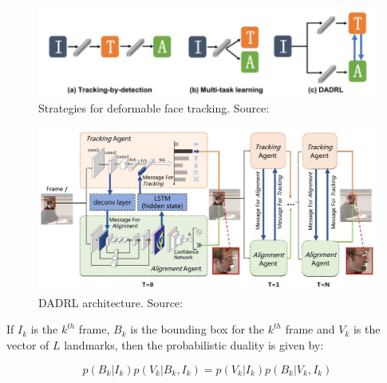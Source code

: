 \documentclass{llncs}
\begin{document}
	\begin{figure}
		\centering
		\includegraphics[scale=0.5]{Media/deformable_face_tracking}
		\vspace{-3mm}
		\caption{Strategies for deformable face tracking. Source:\cite{dadrl}}
		\label{deformable_face_tracking}
		\vspace{-3mm}
	\end{figure}
	\vspace{-1mm}
	\begin{figure}
		\centering
		\includegraphics[scale=0.5]{Media/DADRL}
		\vspace{-3mm}
		\caption{DADRL architecture. Source:\cite{dadrl}}
		\label{dadrl_architecture}
		\vspace{-3mm}
	\end{figure}
	\vspace{-1mm}
	If $I_k$ is the $k^{th}$ frame, $B_k$ is the bounding box for the $k^{th}$ frame and $V_k$ is the vector of $L$ landmarks, then the probabilistic duality is given by:
	
	\begin{equation}
	p\left(B_{k} | I_{k}\right) p\left(V_{k} | B_{k}, I_{k}\right)=p\left(V_{k} | I_{k}\right) p\left(B_{k} | V_{k}, I_{k}\right)
	\end{equation}
	
\end{document}
